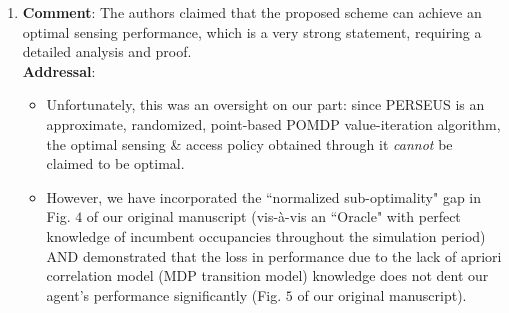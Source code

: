 \documentclass{article}
\begin{document}
\begin{enumerate}

    \item \textbf{Comment}: The authors claimed that the proposed scheme can achieve an optimal sensing performance, which is a very strong statement, requiring a detailed analysis and proof.\\
    \textbf{Addressal}: 
    \begin{itemize}
        \item Unfortunately, this was an oversight on our part: since PERSEUS is an approximate, randomized, point-based POMDP value-iteration algorithm, the optimal sensing \& access policy obtained through it \textit{cannot} be claimed to be optimal.
        \item However, we have incorporated the ``normalized sub-optimality" gap in Fig. $4$ of our original manuscript (vis-\`{a}-vis an ``Oracle" with perfect knowledge of incumbent occupancies throughout the simulation period) AND demonstrated that the loss in performance due to the lack of apriori correlation model (MDP transition model) knowledge does not dent our agent's performance significantly (Fig. $5$ of our original manuscript).
    \end{itemize}
    

\end{enumerate}
\end{document}
